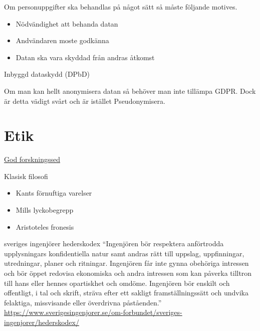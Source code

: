 \begin{multicols}{2}
Om personuppgifter ska behandlas på något sätt så måste följande motives.
\begin{itemize}
\item Nödvändighet att behanda datan
\item Andvändaren moste godkänna
\item Datan ska vara skyddad från andras åtkomst
\end{itemize}

Inbyggd dataskydd (DPbD)

Om man kan hellt anonymisera datan så behöver man inte tillämpa GDPR. Dock är detta vädigt svårt och är istället Pseudonymisera.

%
%
%
%    
%
%
%
%


\section{Etik}

\href{https://www.vr.se/analys/rapporter/vara-rapporter/2017-08-29-god-forskningssed.html}{God forskningssed}

Klasisk filosofi
\begin{itemize}
\item Kants förnuftiga varelser
\item Mills lyckobegrepp
\item Aristoteles fronesis
\end{itemize}

sveriges ingenjörer hederskodex
``Ingenjören bör respektera anförtrodda upplysningars konfidentiella natur
samt andras rätt till uppslag, uppfinningar, utredningar, planer och ritningar.
Ingenjören får inte gynna obehöriga intressen och bör öppet redovisa
ekonomiska och andra intressen som kan påverka tilltron till hans eller hennes
opartiskhet och omdöme.
Ingenjören bör enskilt och offentligt, i tal och skrift, sträva efter ett sakligt
framställningssätt och undvika felaktiga, missvisande eller överdrivna påståenden.''
\url{https://www.sverigesingenjorer.se/om-forbundet/sveriges-ingenjorer/hederskodex/}



\end{multicols}

